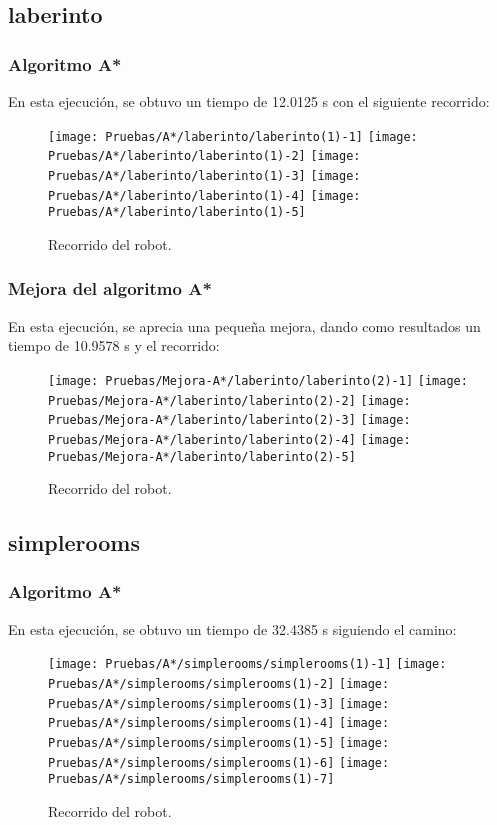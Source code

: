 \documentclass[a4paper, 11pt]{article}
\begin{document}
	\subsection{laberinto}
		\subsubsection{Algoritmo A*}
			En esta ejecución, se obtuvo un tiempo de 12.0125 s con el siguiente recorrido:
			\begin{figure}[H]
				\centering
				\texttt{[image: Pruebas/A*/laberinto/laberinto(1)-1]}
				\texttt{[image: Pruebas/A*/laberinto/laberinto(1)-2]}
				\texttt{[image: Pruebas/A*/laberinto/laberinto(1)-3]}
				\texttt{[image: Pruebas/A*/laberinto/laberinto(1)-4]}
				\texttt{[image: Pruebas/A*/laberinto/laberinto(1)-5]}
				\caption{Recorrido del robot.}
				\label{A-lab}
			\end{figure}
			
		\subsubsection{Mejora del algoritmo A*}
			En esta ejecución, se aprecia una pequeña mejora, dando como resultados un tiempo de 10.9578 s
			y el recorrido: 
			
			\begin{figure}[H]
				\centering
				\texttt{[image: Pruebas/Mejora-A*/laberinto/laberinto(2)-1]}
				\texttt{[image: Pruebas/Mejora-A*/laberinto/laberinto(2)-2]}
				\texttt{[image: Pruebas/Mejora-A*/laberinto/laberinto(2)-3]}
				\texttt{[image: Pruebas/Mejora-A*/laberinto/laberinto(2)-4]}
				\texttt{[image: Pruebas/Mejora-A*/laberinto/laberinto(2)-5]}
				\caption{Recorrido del robot.}
				\label{MA-lab}
			\end{figure}
	\subsection{simplerooms}
		\subsubsection{Algoritmo A*}
			En esta ejecución, se obtuvo un tiempo de 32.4385 s siguiendo el camino:
			\begin{figure}[H]
				\centering
				\texttt{[image: Pruebas/A*/simplerooms/simplerooms(1)-1]}
				\texttt{[image: Pruebas/A*/simplerooms/simplerooms(1)-2]}
				\texttt{[image: Pruebas/A*/simplerooms/simplerooms(1)-3]}
				\texttt{[image: Pruebas/A*/simplerooms/simplerooms(1)-4]}
				\texttt{[image: Pruebas/A*/simplerooms/simplerooms(1)-5]}
				\texttt{[image: Pruebas/A*/simplerooms/simplerooms(1)-6]}
				\texttt{[image: Pruebas/A*/simplerooms/simplerooms(1)-7]}
				\caption{Recorrido del robot.}
				\label{A-sim}
			\end{figure}
			
\end{document}
